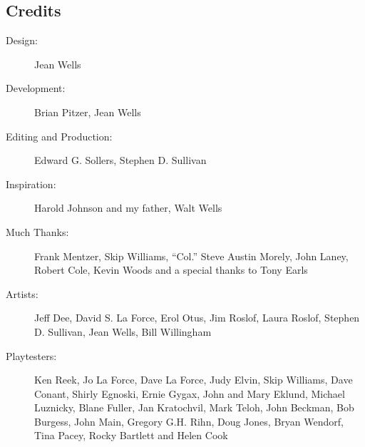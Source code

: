 \documentclass[palace_of_the_silver_princess]{subfiles}
\begin{document}
    \subsection{Credits}
    \begin{description}
        \item[Design:] Jean Wells

        \item[Development:] Brian Pitzer, Jean Wells

        \item[Editing and Production:] Edward G. Sollers, Stephen D. Sullivan

        \item[Inspiration:] Harold Johnson and my father, Walt Wells

        \item[Much Thanks:] Frank Mentzer, Skip Williams, “Col.” Steve Austin
            Morely, John Laney, Robert Cole, Kevin Woods and
            a special thanks to Tony Earls

        \item[Artists:] Jeff Dee, David S. La Force, Erol Otus, Jim Roslof,
            Laura Roslof, Stephen D. Sullivan, Jean Wells,
            Bill Willingham

        \item[Playtesters:] Ken Reek, Jo La Force, Dave La Force, Judy Elvin,
            Skip Williams, Dave Conant, Shirly Egnoski, Ernie Gygax, John
            and Mary Eklund, Michael Luznicky, Blane Fuller, Jan Kratochvil,
            Mark Teloh, John Beckman, Bob Burgess, John Main, Gregory G.H.
            Rihn, Doug Jones, Bryan Wendorf, Tina Pacey, Rocky Bartlett and
            Helen Cook
    \end{description}
\end{document}

